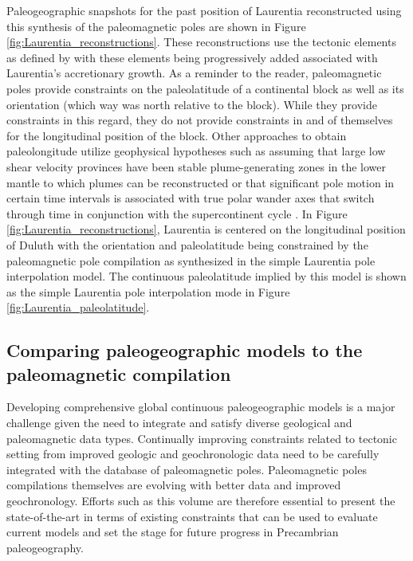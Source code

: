 \documentclass[11pt,letterpaper]{article}
\begin{document}
Paleogeographic snapshots for the past position of Laurentia reconstructed using this synthesis of the paleomagnetic poles are shown in Figure \ref{fig:Laurentia_reconstructions}. These reconstructions use the tectonic elements as defined by \citet{Whitmeyer2007a} with these elements being progressively added associated with Laurentia's accretionary growth. As a reminder to the reader, paleomagnetic poles provide constraints on the paleolatitude of a continental block as well as its orientation (which way was north relative to the block). While they provide constraints in this regard, they do not provide constraints in and of themselves for the longitudinal position of the block. Other approaches to obtain paleolongitude utilize geophysical hypotheses such as assuming that large low shear velocity provinces have been stable plume-generating zones in the lower mantle to which plumes can be reconstructed \citep{Torsvik2014a} or that significant pole motion in certain time intervals is associated with true polar wander axes that switch through time in conjunction with the supercontinent cycle \citep{Mitchell2012a}. In Figure \ref{fig:Laurentia_reconstructions}, Laurentia is centered on the longitudinal position of Duluth with the orientation and paleolatitude being constrained by the paleomagnetic pole compilation as synthesized in the simple Laurentia pole interpolation model. The continuous paleolatitude implied by this model is shown as the simple Laurentia pole interpolation mode in Figure \ref{fig:Laurentia_paleolatitude}.

\subsection{Comparing paleogeographic models to the paleomagnetic compilation}

Developing comprehensive global continuous paleogeographic models is a major challenge given the need to integrate and satisfy diverse geological and paleomagnetic data types. Continually improving constraints related to tectonic setting from improved geologic and geochronologic data need to be carefully integrated with the database of paleomagnetic poles. Paleomagnetic poles compilations themselves are evolving with better data and improved geochronology. Efforts such as this volume are therefore essential to present the state-of-the-art in terms of existing constraints that can be used to evaluate current models and set the stage for future progress in Precambrian paleogeography.
\end{document}
